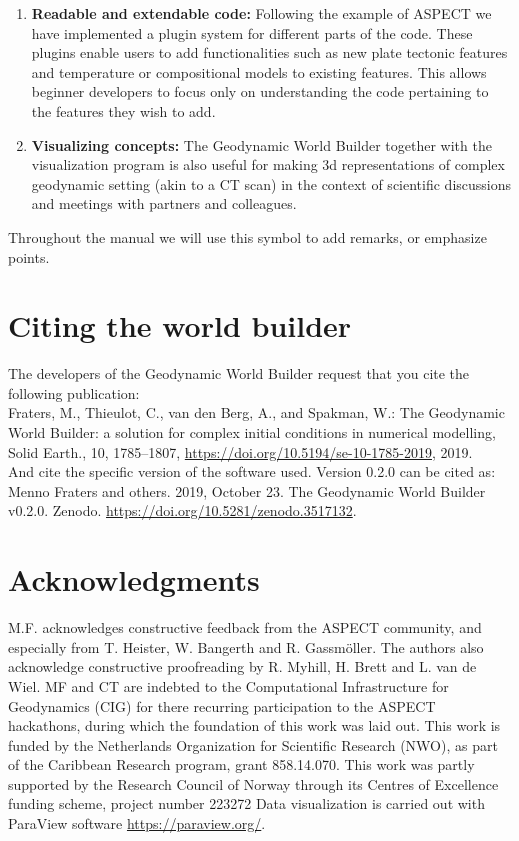 \documentclass{book}
\newcommand{\GWB}{{Geodynamic World Builder}}
\newcommand{\aspect}{{ASPECT}}
\begin{document}
\begin{enumerate}
    \item {\bf Readable and extendable code:} Following the example of \aspect{} we have implemented a plugin system for different parts of the code. These plugins enable users to add functionalities such as new plate tectonic features and temperature or compositional models to existing features. This allows beginner developers to focus only on understanding the code pertaining to the features they wish to add. 
    
    \item {\bf Visualizing concepts:} The \GWB{} together with the visualization program is also useful for making 3d representations of complex geodynamic setting (akin to a CT scan) in the context of scientific discussions and meetings with partners and colleagues. 
\end{enumerate}

\begin{remark}
Throughout the manual we will use this symbol to add remarks, or emphasize points.
\end{remark}


\section{Citing the world builder}
The developers of the Geodynamic World Builder request that you cite the following publication:\\

\noindent Fraters, M., Thieulot, C., van den Berg, A., and Spakman, W.: The Geodynamic World Builder: a solution for complex initial conditions in numerical modelling, Solid Earth., 10, 1785–1807, \url{https://doi.org/10.5194/se-10-1785-2019}, 2019.\\

\noindent And cite the specific version of the software used. Version 0.2.0 can be cited as:\\

\noindent Menno Fraters and others. 2019, October 23. The Geodynamic World Builder v0.2.0. Zenodo. \url{https://doi.org/10.5281/zenodo.3517132}.


\section{Acknowledgments}
M.F. acknowledges constructive feedback from the ASPECT community, and especially from T. Heister, W. Bangerth and R. Gassm\"oller. The authors also acknowledge constructive proofreading by R. Myhill, H. Brett and L. van de Wiel. MF and CT are indebted to the Computational Infrastructure for Geodynamics (CIG) for there recurring participation to the ASPECT hackathons, during which the foundation of this work was laid out.
This work is funded by the Netherlands Organization for Scientific Research (NWO), as part of the Caribbean Research program, grant 858.14.070. This work was partly supported by the Research Council of Norway through its Centres of Excellence funding scheme, project number 223272
Data visualization is carried out with ParaView software \url{https://paraview.org/}.
\end{document}
